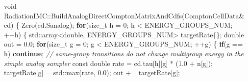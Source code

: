 \documentclass[
]{article}
\newenvironment{Shaded}{}{}
\newcommand{\AttributeTok}[1]{\textcolor[rgb]{0.49,0.56,0.16}{#1}}
\newcommand{\BuiltInTok}[1]{\textcolor[rgb]{0.00,0.50,0.00}{#1}}
\newcommand{\CommentTok}[1]{\textcolor[rgb]{0.38,0.63,0.69}{\textit{#1}}}
\newcommand{\ControlFlowTok}[1]{\textcolor[rgb]{0.00,0.44,0.13}{\textbf{#1}}}
\newcommand{\DataTypeTok}[1]{\textcolor[rgb]{0.56,0.13,0.00}{#1}}
\newcommand{\DecValTok}[1]{\textcolor[rgb]{0.25,0.63,0.44}{#1}}
\newcommand{\FloatTok}[1]{\textcolor[rgb]{0.25,0.63,0.44}{#1}}
\newcommand{\NormalTok}[1]{#1}
\newcommand{\OperatorTok}[1]{\textcolor[rgb]{0.40,0.40,0.40}{#1}}
\begin{document}
\begin{Shaded}
\begin{Highlighting}[]
\DataTypeTok{void}\NormalTok{ RadiationIMC}\OperatorTok{::}\NormalTok{BuildAnalogDirectComptonMatrixAndCdfs}\OperatorTok{(}\NormalTok{ComptonCellData}\OperatorTok{\&}\NormalTok{ cd}\OperatorTok{)}
\OperatorTok{\{}
\NormalTok{    Zero}\OperatorTok{(}\NormalTok{cd}\OperatorTok{.}\NormalTok{Sanalog}\OperatorTok{);}
    \ControlFlowTok{for}\OperatorTok{(}\DataTypeTok{size\_t}\NormalTok{ h }\OperatorTok{=} \DecValTok{0}\OperatorTok{;}\NormalTok{ h }\OperatorTok{\textless{}}\NormalTok{ ENERGY\_GROUPS\_NUM}\OperatorTok{;} \OperatorTok{++}\NormalTok{h}\OperatorTok{)}
    \OperatorTok{\{}
        \BuiltInTok{std::}\NormalTok{array}\OperatorTok{\textless{}}\DataTypeTok{double}\OperatorTok{,}\NormalTok{ ENERGY\_GROUPS\_NUM}\OperatorTok{\textgreater{}}\NormalTok{ targetRate}\OperatorTok{\{\};}
        \DataTypeTok{double}\NormalTok{ out }\OperatorTok{=} \FloatTok{0.0}\OperatorTok{;}
        \ControlFlowTok{for}\OperatorTok{(}\DataTypeTok{size\_t}\NormalTok{ g }\OperatorTok{=} \DecValTok{0}\OperatorTok{;}\NormalTok{ g }\OperatorTok{\textless{}}\NormalTok{ ENERGY\_GROUPS\_NUM}\OperatorTok{;} \OperatorTok{++}\NormalTok{g}\OperatorTok{)}
        \OperatorTok{\{}
            \ControlFlowTok{if}\OperatorTok{(}\NormalTok{g }\OperatorTok{==}\NormalTok{ h}\OperatorTok{)}
                \ControlFlowTok{continue}\OperatorTok{;}  \CommentTok{// same{-}group transitions do not change multigroup energy in the simple analog sampler}
            \AttributeTok{const} \DataTypeTok{double}\NormalTok{ rate }\OperatorTok{=}\NormalTok{ cd}\OperatorTok{.}\NormalTok{tau}\OperatorTok{[}\NormalTok{h}\OperatorTok{][}\NormalTok{g}\OperatorTok{]} \OperatorTok{*} \OperatorTok{(}\FloatTok{1.0} \OperatorTok{+}\NormalTok{ n}\OperatorTok{[}\NormalTok{g}\OperatorTok{]);}
\NormalTok{            targetRate}\OperatorTok{[}\NormalTok{g}\OperatorTok{]} \OperatorTok{=} \BuiltInTok{std::}\NormalTok{max}\OperatorTok{(}\NormalTok{rate}\OperatorTok{,} \FloatTok{0.0}\OperatorTok{);}
\NormalTok{            out }\OperatorTok{+=}\NormalTok{ targetRate}\OperatorTok{[}\NormalTok{g}\OperatorTok{];}


\end{Highlighting}
\end{Shaded}
\end{document}
